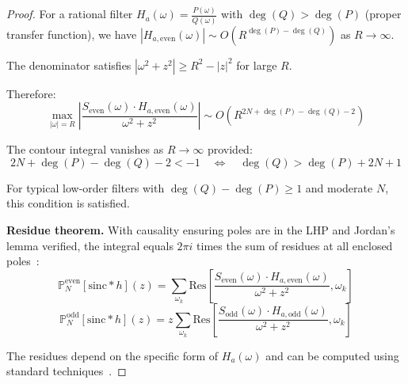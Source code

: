 \begin{theorem}
\begin{proof}
For a rational filter $H_a(\omega) = \frac{P(\omega)}{Q(\omega)}$ with $\deg(Q) > \deg(P)$ (proper transfer function), we have $|H_{a,\text{even}}(\omega)| \sim O(R^{\deg(P)-\deg(Q)})$ as $R \to \infty$.

The denominator satisfies $|\omega^2 + z^2| \geq R^2 - |z|^2$ for large $R$.

Therefore:
\[
\max_{|\omega|=R} \left|\frac{S_{\text{even}}(\omega) \cdot H_{a,\text{even}}(\omega)}{\omega^2+z^2}\right| \sim O(R^{2N + \deg(P) - \deg(Q) - 2})
\]

The contour integral vanishes as $R \to \infty$ provided:
\[
2N + \deg(P) - \deg(Q) - 2 < -1 \quad \Longleftrightarrow \quad \deg(Q) > \deg(P) + 2N + 1
\]

For typical low-order filters with $\deg(Q) - \deg(P) \geq 1$ and moderate $N$, this condition is satisfied.

\textbf{Residue theorem.} With causality ensuring poles are in the LHP and Jordan's lemma verified, the integral equals $2\pi i$ times the sum of residues at all enclosed poles~\cite{Ahlfors1979}:
\[
\mathbb{P}_N^{\text{even}}[\text{sinc} * h](z) = \sum_{\omega_k} \text{Res}\left[\frac{S_{\text{even}}(\omega) \cdot H_{a,\text{even}}(\omega)}{\omega^2+z^2}, \omega_k\right]
\]
\[
\mathbb{P}_N^{\text{odd}}[\text{sinc} * h](z) = z \sum_{\omega_k} \text{Res}\left[\frac{S_{\text{odd}}(\omega) \cdot H_{a,\text{odd}}(\omega)}{\omega^2+z^2}, \omega_k\right]
\]

The residues depend on the specific form of $H_a(\omega)$ and can be computed using standard techniques~\cite{Stein2003}.
\end{proof}
\end{theorem}

